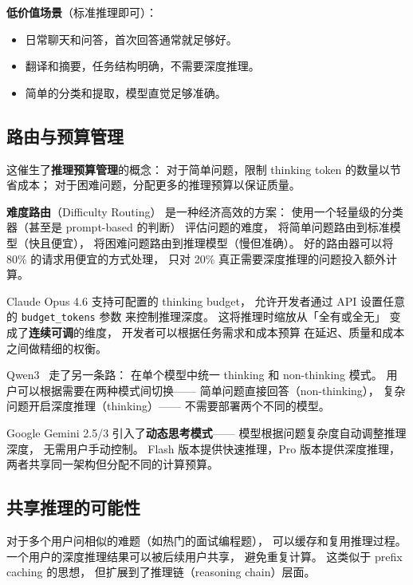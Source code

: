 \textbf{低价值场景}（标准推理即可）：
\begin{itemize}[noitemsep]
  \item 日常聊天和问答，首次回答通常就足够好。
  \item 翻译和摘要，任务结构明确，不需要深度推理。
  \item 简单的分类和提取，模型直觉足够准确。
\end{itemize}

\subsection{路由与预算管理}

这催生了\textbf{推理预算管理}的概念：
对于简单问题，限制 thinking token 的数量以节省成本；
对于困难问题，分配更多的推理预算以保证质量。

\textbf{难度路由}（Difficulty Routing）
是一种经济高效的方案：
使用一个轻量级的分类器（甚至是 prompt-based 的判断）
评估问题的难度，
将简单问题路由到标准模型（快且便宜），
将困难问题路由到推理模型（慢但准确）。
好的路由器可以将 80\% 的请求用便宜的方式处理，
只对 20\% 真正需要深度推理的问题投入额外计算。

\begin{corebox}
Claude Opus 4.6 支持可配置的 thinking budget，
允许开发者通过 API 设置任意的 \texttt{budget\_tokens} 参数
来控制推理深度。
这将推理时缩放从「全有或全无」
变成了\textbf{连续可调}的维度，
开发者可以根据任务需求和成本预算
在延迟、质量和成本之间做精细的权衡。

Qwen3~\cite{qwen2025qwen3} 走了另一条路：
在单个模型中统一 thinking 和 non-thinking 模式。
用户可以根据需要在两种模式间切换——
简单问题直接回答（non-thinking），
复杂问题开启深度推理（thinking）——
不需要部署两个不同的模型。

Google Gemini 2.5/3 引入了\textbf{动态思考模式}——
模型根据问题复杂度自动调整推理深度，
无需用户手动控制。
Flash 版本提供快速推理，Pro 版本提供深度推理，
两者共享同一架构但分配不同的计算预算。
\end{corebox}

\subsection{共享推理的可能性}

对于多个用户问相似的难题（如热门的面试编程题），
可以缓存和复用推理过程。
一个用户的深度推理结果可以被后续用户共享，
避免重复计算。
这类似于 prefix caching 的思想，
但扩展到了推理链（reasoning chain）层面。


